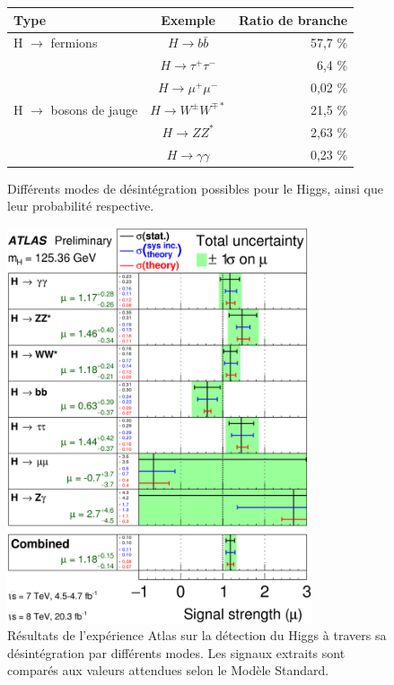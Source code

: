 \documentclass[11pt]{article} %
\begin{document}
\begin{figure}[H]
\centering
\begin{tabular}{|l|c|r|} 
   \hline
   Type & Exemple & Ratio de branche\\
    \hline
    H $\to$ fermions & $H \to b\bar{b} $ & 57,7 \% \\
    \cline{2-3} 
        & $H \to \tau^+\tau^-$ & 6,4 \% \\
   \cline{2-3} 
        & $H \to \mu^+\mu^-$ & 0,02 \%\\
    \hline
  H $\to$ bosons de jauge & $H \to W^{\pm}W^{\mp*}$ &21,5 \% \\
   \cline{2-3}
     & $H \to ZZ^*$ & 2,63 \% \\
   \cline{2-3}
      & $H \to \gamma \gamma$ & 0,23 \% \\
  \hline
\end{tabular}
\caption{Différents modes de désintégration possibles pour le Higgs, ainsi que leur probabilité respective. }
\end{figure}


\begin{figure}[H]
\centering
  \caption{Résultats de l'expérience Atlas sur la détection du Higgs à travers sa désintégration par différents modes. Les signaux extraits sont comparés aux valeurs attendues selon le Modèle Standard.}
 \includegraphics[width=0.8\textwidth]{../images/fig_02.png}
\end{figure}
\end{document}
